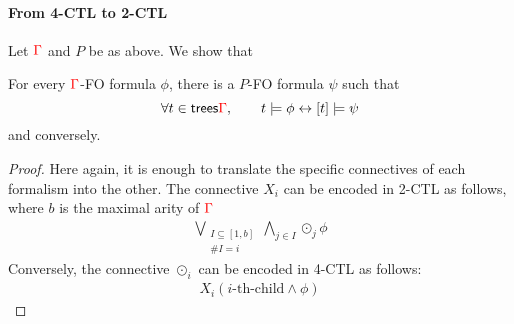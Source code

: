 \paragraph{From 4-CTL to 2-CTL}
Let ${\color{red}{\Gamma}}$ and $P$ be as above. We show that
\begin{lemma}\label{lem:from-4-CTL-to-2CTL}
For every ${\color{red}{\Gamma}}$-FO formula $\phi$, there is a $P$-FO formula $\psi$ such that
$$ \forall t\in \mathsf {trees}{\color{red}{\Gamma}}, \qquad t\models \phi \leftrightarrow [t]\models \psi$$
and conversely. \end{lemma}
\begin{proof}
Here again, it is enough to translate the specific connectives of each formalism into the other. The connective $X_i$ can be encoded in 2-CTL as follows, where $b$ is the maximal arity of ${\color{red}{\Gamma}}$
\begin{align*}
\underset{\begin{array}{c}
{\scriptstyle I\subseteq [1,b]}\\ {\scriptstyle\#I=i}
\end{array}}{\bigvee} \underset{j\in I}{\bigwedge} \odot_j \phi
\end{align*}
Conversely, the connective $\odot_i$ can be encoded in 4-CTL as follows:
\begin{align*}
X_i(i\text{-th-child}\wedge \phi)
\end{align*}
\end{proof}
